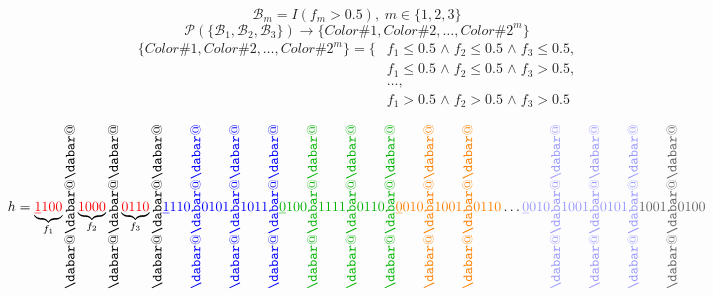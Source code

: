 \documentclass{article}
\begin{document}
\newpage
 \def \n{6}
 \def \scl{0.5}
 \def \rects {
    (0, -\scl)/red/0,(\scl, 0)/blue/1,(0, -2*\scl)/green!70!black/2,(\scl,  -\scl)/yellow/3,(2* \scl,  0)/orange/4,(\scl,  \scl + 0)/purple/5,(\scl,  2*\scl + 0)/brown/6,(2*\scl,  \scl+ 0)/gray/7,(3 * \scl,  0)/pink/8,(2*\scl, -\scl)/blue!40!white/9, (\scl, -2*\scl)/blue!40!white/9, (0, -3 *\scl)/pink/8,(0, -4 * \scl) /gray/7,(\scl,  -3 * \scl) /brown/6, (2*\scl,  -2*\scl)/purple/5,(3*\scl,  - \scl)/orange/4,(4 * \scl,  0)/yellow/3, (3 * \scl,  \scl)/green!70!black/2,(2 * \scl, 2 * \scl)/blue/1,(\scl,  3 * \scl + 0)/red/0,(0,0)/white!80!black/r
 }
$$\mathcal B_m = I(f_m > 0.5), \hspace{3pt} m \in \{1,2,3\}$$
$$\mathcal P (\{\mathcal B_1, \mathcal B_2, \mathcal B_3\}) \rightarrow \{Color\#1, Color\#2, \dotsc, Color\#2^m\}$$
\begin{align*}
	\{Color\#1, Color\#2, \dotsc, Color\#2^m\} = \{&f_1 \leq 0.5 \hspace{1pt} \wedge \hspace{1pt} f_2 \leq 0.5 \hspace{1pt} \wedge \hspace{1pt} f_3 \leq 0.5,\\
	&f_1 \leq 0.5 \hspace{1pt} \wedge \hspace{1pt} f_2 \leq 0.5 \hspace{1pt} \wedge \hspace{1pt} f_3 > 0.5,\\
	&\dots,\\
	& f_1 > 0.5 \hspace{1pt} \wedge \hspace{1pt} f_2 > 0.5 \hspace{1pt} \wedge \hspace{1pt} f_3 > 0.5
\end{align*}


\makeatletter
\newcommand*\dashline{\rotatebox[origin=c]{90}{$\dabar@\dabar@\dabar@$}}
\makeatother
$$h = \underbrace{\textcolor{red}{\underline{1}100}}_{f_1} \dashline \underbrace{\textcolor{red}{1000}}_{f_2} \dashline \underbrace{\textcolor{red}{0110}}_{f_3} \dashline \textcolor{blue}{\underline{1}110 \dashline 0101 \dashline 1011 \dashline }\textcolor{green!70!black}{\underline{0}100 \dashline 1111 \dashline 0110 \dashline }\textcolor{orange}{\underline{0}010 \dashline 1001 \dashline 0110}\dots\textcolor{blue!40!white}{\underline{0}010 \dashline 1001 \dashline 0101 \dashline }\textcolor{white!40!black}{1001 \dashline 0100}$$
\end{document}
